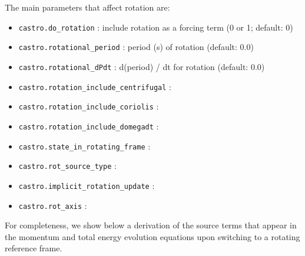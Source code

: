 The main parameters that affect rotation are:
\begin{itemize}

\item {\tt castro.do\_rotation} : include rotation as a forcing term
  (0 or 1; default: 0) 

\item {\tt castro.rotational\_period} : period (s) of rotation (default:  0.0)

\item {\tt castro.rotational\_dPdt} : d(period) / dt for rotation (default: 0.0)

\item {\tt castro.rotation\_include\_centrifugal} :

\item {\tt castro.rotation\_include\_coriolis} :

\item {\tt castro.rotation\_include\_domegadt} :

\item {\tt castro.state\_in\_rotating\_frame} :

\item {\tt castro.rot\_source\_type} :

\item {\tt castro.implicit\_rotation\_update} :

\item {\tt castro.rot\_axis} :

\end{itemize}

For completeness, we show below a derivation of the source terms that
appear in the momentum and total energy evolution equations upon
switching to a rotating reference frame.


